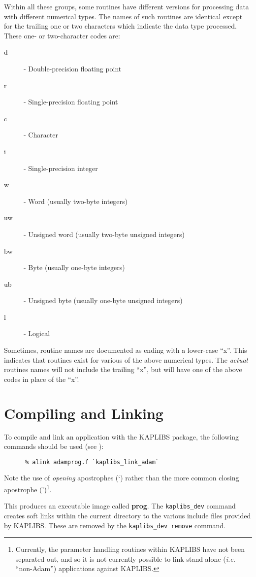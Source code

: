 Within all these groups, some routines have different versions for
processing data with different numerical types. The names of such
routines are identical except for the trailing one or two characters
which indicate the data type processed. These one- or two-character
codes are:

\begin{description}
\item [d] - Double-precision floating point
\item [r] - Single-precision floating point
\item [c] - Character
\item [i] - Single-precision integer
\item [w] - Word (usually two-byte integers)
\item [uw] - Unsigned word (usually two-byte unsigned integers)
\item [bw] - Byte (usually one-byte integers)
\item [ub] - Unsigned byte (usually one-byte unsigned integers)
\item [l] - Logical
\end{description}

Sometimes, routine names are documented as ending with a lower-case
``x''. This indicates that routines exist for various of the above
numerical types. The \emph{actual} routines names will not include the trailing
``x'', but will have one of the above codes in place of the ``x''.

\section{Compiling and Linking}
To compile and link an application with the KAPLIBS package, the following
commands should be used (see ):

\small
\begin{verbatim}
      % alink adamprog.f `kaplibs_link_adam`
\end{verbatim}
\normalsize

Note the use of {\em opening} apostrophes (`) rather than the more common
closing apostrophe (')\footnote{Currently, the parameter handling
routines within KAPLIBS have not been separated out, and so it is not
currently possible to link stand-alone (\emph{i.e.} ``non-Adam'')
applications against KAPLIBS.}.

This produces an executable image called {\bf prog}. The
\verb+kaplibs_dev+ command creates soft links within the current
directory to the various include files provided by KAPLIBS. These are
removed by the \verb+kaplibs_dev remove+ command.

